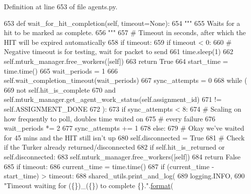 Definition at line 653 of file agents.\+py.


\begin{DoxyCode}
653     \textcolor{keyword}{def }wait\_for\_hit\_completion(self, timeout=None):
654         \textcolor{stringliteral}{"""}
655 \textcolor{stringliteral}{        Waits for a hit to be marked as complete.}
656 \textcolor{stringliteral}{        """}
657         \textcolor{comment}{# Timeout in seconds, after which the HIT will be expired automatically}
658         \textcolor{keywordflow}{if} timeout:
659             \textcolor{keywordflow}{if} timeout < 0:
660                 \textcolor{comment}{# Negative timeout is for testing, wait for packet to send}
661                 time.sleep(1)
662                 self.mturk\_manager.free\_workers([self])
663                 \textcolor{keywordflow}{return} \textcolor{keyword}{True}
664             start\_time = time.time()
665         wait\_periods = 1
666         self.wait\_completion\_timeout(wait\_periods)
667         sync\_attempts = 0
668         \textcolor{keywordflow}{while} (
669             \textcolor{keywordflow}{not} self.hit\_is\_complete
670             \textcolor{keywordflow}{and} self.mturk\_manager.get\_agent\_work\_status(self.assignment\_id)
671             != self.ASSIGNMENT\_DONE
672         ):
673             \textcolor{keywordflow}{if} sync\_attempts < 8:
674                 \textcolor{comment}{# Scaling on how frequently to poll, doubles time waited on}
675                 \textcolor{comment}{# every failure}
676                 wait\_periods *= 2
677                 sync\_attempts += 1
678             \textcolor{keywordflow}{else}:
679                 \textcolor{comment}{# Okay we've waited for 45 mins and the HIT still isn't up}
680                 self.disconnected = \textcolor{keyword}{True}
681             \textcolor{comment}{# Check if the Turker already returned/disconnected}
682             \textcolor{keywordflow}{if} self.hit\_is\_returned \textcolor{keywordflow}{or} self.disconnected:
683                 self.mturk\_manager.free\_workers([self])
684                 \textcolor{keywordflow}{return} \textcolor{keyword}{False}
685             \textcolor{keywordflow}{if} timeout:
686                 current\_time = time.time()
687                 \textcolor{keywordflow}{if} (current\_time - start\_time) > timeout:
688                     shared\_utils.print\_and\_log(
689                         logging.INFO,
690                         \textcolor{stringliteral}{"Timeout waiting for (\{\})\_(\{\}) to complete \{\}."}.\hyperlink{namespaceparlai_1_1chat__service_1_1services_1_1messenger_1_1shared__utils_a32e2e2022b824fbaf80c747160b52a76}{format}(

\end{DoxyCode}
